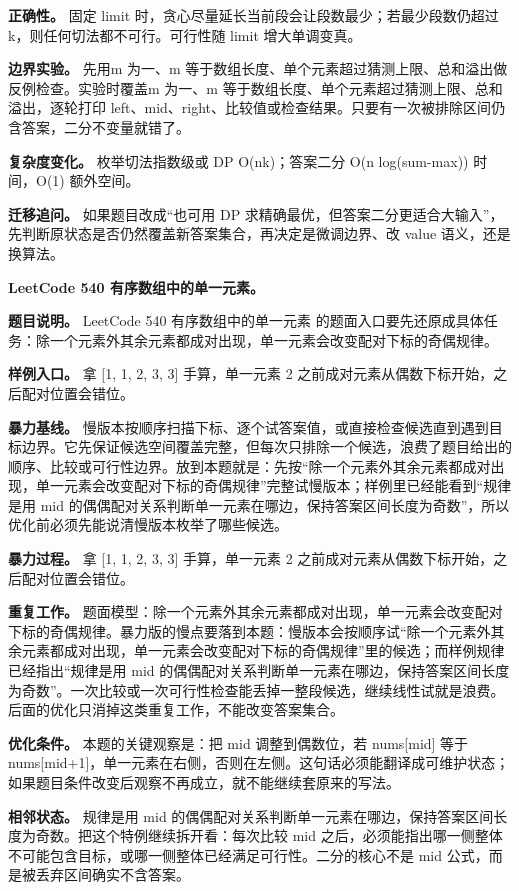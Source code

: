 \textbf{正确性。} 固定 limit 时，贪心尽量延长当前段会让段数最少；若最少段数仍超过 k，则任何切法都不可行。可行性随 limit 增大单调变真。

\textbf{边界实验。} 先用m 为一、m 等于数组长度、单个元素超过猜测上限、总和溢出做反例检查。实验时覆盖m 为一、m 等于数组长度、单个元素超过猜测上限、总和溢出，逐轮打印 left、mid、right、比较值或检查结果。只要有一次被排除区间仍含答案，二分不变量就错了。

\textbf{复杂度变化。} 枚举切法指数级或 DP O(nk)；答案二分 O(n log(sum-max)) 时间，O(1) 额外空间。

\textbf{迁移追问。} 如果题目改成“也可用 DP 求精确最优，但答案二分更适合大输入”，先判断原状态是否仍然覆盖新答案集合，再决定是微调边界、改 value 语义，还是换算法。

\noindent\textbf{LeetCode 540 有序数组中的单一元素。}

\textbf{题目说明。} LeetCode 540 有序数组中的单一元素 的题面入口要先还原成具体任务：除一个元素外其余元素都成对出现，单一元素会改变配对下标的奇偶规律。

\textbf{样例入口。} 拿 [1, 1, 2, 3, 3] 手算，单一元素 2 之前成对元素从偶数下标开始，之后配对位置会错位。

\textbf{暴力基线。} 慢版本按顺序扫描下标、逐个试答案值，或直接检查候选直到遇到目标边界。它先保证候选空间覆盖完整，但每次只排除一个候选，浪费了题目给出的顺序、比较或可行性边界。放到本题就是：先按“除一个元素外其余元素都成对出现，单一元素会改变配对下标的奇偶规律”完整试慢版本；样例里已经能看到“规律是用 mid 的偶偶配对关系判断单一元素在哪边，保持答案区间长度为奇数”，所以优化前必须先能说清慢版本枚举了哪些候选。

\textbf{暴力过程。} 拿 [1, 1, 2, 3, 3] 手算，单一元素 2 之前成对元素从偶数下标开始，之后配对位置会错位。

\textbf{重复工作。} 题面模型：除一个元素外其余元素都成对出现，单一元素会改变配对下标的奇偶规律。暴力版的慢点要落到本题：慢版本会按顺序试“除一个元素外其余元素都成对出现，单一元素会改变配对下标的奇偶规律”里的候选；而样例规律已经指出“规律是用 mid 的偶偶配对关系判断单一元素在哪边，保持答案区间长度为奇数”。一次比较或一次可行性检查能丢掉一整段候选，继续线性试就是浪费。后面的优化只消掉这类重复工作，不能改变答案集合。

\textbf{优化条件。} 本题的关键观察是：把 mid 调整到偶数位，若 nums[mid] 等于 nums[mid+1]，单一元素在右侧，否则在左侧。这句话必须能翻译成可维护状态；如果题目条件改变后观察不再成立，就不能继续套原来的写法。

\textbf{相邻状态。} 规律是用 mid 的偶偶配对关系判断单一元素在哪边，保持答案区间长度为奇数。把这个特例继续拆开看：每次比较 mid 之后，必须能指出哪一侧整体不可能包含目标，或哪一侧整体已经满足可行性。二分的核心不是 mid 公式，而是被丢弃区间确实不含答案。

